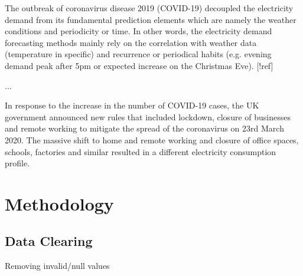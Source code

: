 \documentclass[energies,article,submit,moreauthors,pdftex]{Definitions/mdpi}
\begin{document}

The outbreak of coronavirus disease 2019 (COVID-19) decoupled the electricity demand from its fundamental prediction elements which are namely the weather conditions and periodicity or time. In other words, the electricity demand forecasting methods mainly rely on the correlation with weather data (temperature in specific) and recurrence or periodical habits (e.g. evening demand peak after 5pm or expected increase on the Christmas Eve). [!ref]

...


 In response to the increase in the number of COVID-19 cases, the UK government announced new rules that included lockdown, closure of businesses and remote working to mitigate the spread of the coronavirus on 23rd March 2020. The massive shift to home and remote working and closure of office spaces, schools, factories and similar resulted in a different electricity consumption profile.



 
\section{Methodology}

\subsection{Data Clearing}
Removing invalid/null values
\end{document}
